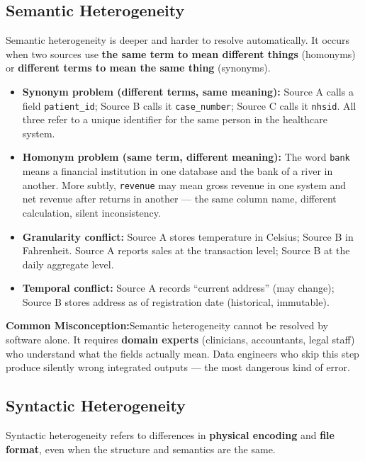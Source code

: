 \documentclass[12pt,a4paper]{article}
\newcommand{\cautionbox}[1]{%
  \noindent
  \colorbox{PURed!10}{%
    \begin{minipage}{\dimexpr\linewidth-2\fboxsep}
      \vspace{4pt}\textcolor{PURed}{\textbf{Common Misconception:}}\;#1
      \vspace{4pt}
    \end{minipage}%
  }\par\vspace{6pt}%
}
\begin{document}
\subsection{Semantic Heterogeneity}

Semantic heterogeneity is deeper and harder to resolve automatically.  It occurs when two sources use \textbf{the same term to mean different things} (homonyms) or \textbf{different terms to mean the same thing} (synonyms).

\begin{itemize}[leftmargin=1.8em]
  \item \textbf{Synonym problem (different terms, same meaning):}  Source A calls a field \texttt{patient\_id}; Source B calls it \texttt{case\_number}; Source C calls it \texttt{nhsid}.  All three refer to a unique identifier for the same person in the healthcare system.
  \item \textbf{Homonym problem (same term, different meaning):}  The word \texttt{bank} means a financial institution in one database and the bank of a river in another.  More subtly, \texttt{revenue} may mean gross revenue in one system and net revenue after returns in another — the same column name, different calculation, silent inconsistency.
  \item \textbf{Granularity conflict:}  Source A stores temperature in Celsius; Source B in Fahrenheit.  Source A reports sales at the transaction level; Source B at the daily aggregate level.
  \item \textbf{Temporal conflict:}  Source A records ``current address'' (may change); Source B stores address as of registration date (historical, immutable).
\end{itemize}

\cautionbox{Semantic heterogeneity cannot be resolved by software alone.  It requires \textbf{domain experts} (clinicians, accountants, legal staff) who understand what the fields actually mean.  Data engineers who skip this step produce silently wrong integrated outputs — the most dangerous kind of error.}

\subsection{Syntactic Heterogeneity}

Syntactic heterogeneity refers to differences in \textbf{physical encoding} and \textbf{file format}, even when the structure and semantics are the same.
\end{document}
